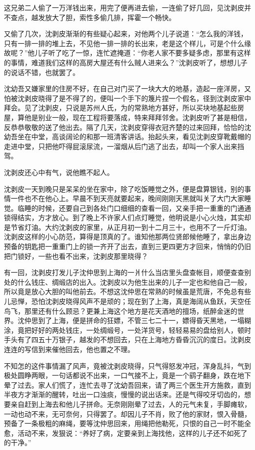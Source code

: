 \documentclass[12pt,UTF8]{ctexbook}
\begin{document}
{{{这兄弟二人偷了一万洋钱出来，用完了便再进去偷，一连偷了好几回，见沈剥皮并不查点，越发放大了胆，索性多偷几排，挥霍一个畅快。

又偷了几次，沈剥皮渐渐的有些疑心起来，对他两个儿子说道：“怎么我的洋钱，只有一排一排的堆上去，不见他一排一排的长出来，老是这个样儿，可是个什么缘故呢？”他儿子听了吃了一惊，连忙遮掩道：“你老人家不要多疑多虑，那里有这样的事情，难道我们这样的高房大屋还有什么贼人进来么？”沈剥皮听了，想想儿子的说话不错，也就罢了。

沈幼吾又嫌家里的住房不好，在自己对门买了一块大大的地基，造起一座洋房，又怕被沈剥皮晓得了是不得了的，便叫一个手下的篾片捏一个假名，径到沈剥皮家中拜会。见了沈剥皮，只说是苏州人氏，为的常熟地方甚好，所以买块地基起些房屋，算他是别业一般，现在工程将要落成，特来拜拜邻舍。沈剥皮听了甚是相信，反恭恭敬敬的送了他出去。隔了几天，沈剥皮穿得衣冠齐楚的过来回拜，恰恰的沈幼吾坐在中堂，高谈阔论的和那一班清客讲话。抬起头来，看见沈剥皮穿靴戴帽的走进中堂，只把他吓得屁滚尿流，一溜烟从后门逃了出去，却叫一个家人出来挡驾。

沈剥皮还心中有气，说他瞧不起人。

沈剥皮一天到晚只是呆呆的坐在家中，除了吃饭睡觉之外，便是盘算银钱，别的事情一件也不在他心上。早晨不到天亮就要起来，晚间刚刚天黑就叫关了大门大家睡觉。临睡的时候，还要自己到各处门口细细的查看一回，又亲手把一重重的门通通锁得结实，方才放心。到了晚上不许家人们点灯睡觉，他明说是小心火烛，其实却是节省灯油。大约沈剥皮的家里，从正月初一到十二月三十，也用不了一斤灯油。沈剥皮这样的小心防范，算得是顶真的了。谁知他那两位贤郎候他睡了，拿出身边预备的钥匙把一重重门上的锁一齐开了出去，直到三更四更方才回来，悄悄的仍旧把门锁好，一些也看不出来，沈剥皮那里晓得？

有一回，沈剥皮打发儿子沈仲思到上海的一爿什么当店里头盘查帐目，顺便查查别处的什么钱庄、绸缎店的出入。沈剥皮以为他生出来的儿子一定也和他自己一般，所以竟是放心大胆的叫他前去。不想这沈仲思在常熟的时候虽是荒唐，不免总有些儿忌惮，恐怕沈剥皮晓得风声不是顽的；现在到了上海，真是海阔从鱼跃，天空任鸟飞，那里还有什么顾忌？更兼上海这个地方是花天酒地的擅场，纸醉金迷的世界。沈仲思到了上海，便是拼命的狂嫖，不管三七二十一，嫖得昏天黑地，一塌糊涂，竟把好好的两处钱庄，一处绸缎号，一处洋货号，轻轻易易的盘给别人，顿时手头有了四五十万银子，越发的不想回去，只在上海地方昏昏沉沉的度日。沈剥皮连连的写信到来催他回去，他也置之不理。

不知怎的这件事情漏了风声，竟被沈剥皮晓得，只气得怒发冲冠，浑身乱抖，气到极处圆睁两眼，一句话都说不出来，一口气接不上，竟是一个鹞子翻身，跌在地下晕了过去。家人们慌了，连忙去寻了沈幼吾回来，请了两三个医生开方施救，直到半夜方才渐渐的醒转，吐出一口浊痰，慢慢的说出话来。还是气得咬牙切齿的，想要亲自赶到上海去和他儿子拼命。无奈刚刚晕了过去，人的元气未复，手脚瘫软，一动也动不来，无可奈何，只得罢了。却因儿子不肖，败了他的家财，恨入骨髓，预备了一条极粗的麻绳，要等沈仲思回来，用绳把他勒死，只恨的自己一时不能全愈，活动不来，发狠说：“养好了病，定要亲到上海找他，这样的儿子还不如死了的干净。”

}}}
\end{document}
